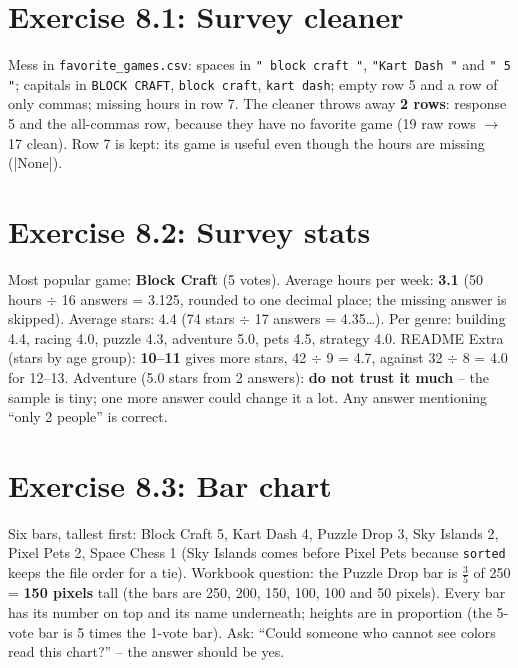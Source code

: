 
\section{Exercise 8.1: Survey cleaner}
\begin{answer}[Answers]
Mess in \texttt{favorite\_games.csv}: spaces in \texttt{" block craft "}, \texttt{"Kart Dash "} and \texttt{" 5 "}; capitals in \texttt{BLOCK CRAFT}, \texttt{block craft}, \texttt{kart dash}; empty row 5 and a row of only commas; missing hours in row 7.
The cleaner throws away \textbf{2 rows}: response 5 and the all-commas row, because they have no favorite game (19 raw rows $\rightarrow$ 17 clean). Row 7 is kept: its game is useful even though the hours are missing (\py|None|).
\end{answer}

\section{Exercise 8.2: Survey stats}
\begin{answer}[Answers]
Most popular game: \textbf{Block Craft} (5 votes). Average hours per week: \textbf{3.1} (50 hours $\div$ 16 answers = 3.125, rounded to one decimal place; the missing answer is skipped). Average stars: 4.4 (74 stars $\div$ 17 answers = 4.35\ldots). Per genre: building 4.4, racing 4.0, puzzle 4.3, adventure 5.0, pets 4.5, strategy 4.0.
README Extra (stars by age group): \textbf{10--11} gives more stars, 42 $\div$ 9 = 4.7, against 32 $\div$ 8 = 4.0 for 12--13.
Adventure (5.0 stars from 2 answers): \textbf{do not trust it much} -- the sample is tiny; one more answer could change it a lot. Any answer mentioning \enquote{only 2 people} is correct.
\end{answer}

\section{Exercise 8.3: Bar chart}
\begin{answer}
Six bars, tallest first: Block Craft 5, Kart Dash 4, Puzzle Drop 3, Sky Islands 2, Pixel Pets 2, Space Chess 1 (Sky Islands comes before Pixel Pets because \texttt{sorted} keeps the file order for a tie). Workbook question: the Puzzle Drop bar is $\frac{3}{5}$ of 250 = \textbf{150 pixels} tall (the bars are 250, 200, 150, 100, 100 and 50 pixels). Every bar has its number on top and its name underneath; heights are in proportion (the 5-vote bar is 5 times the 1-vote bar). Ask: \enquote{Could someone who cannot see colors read this chart?} -- the answer should be yes.
\end{answer}

